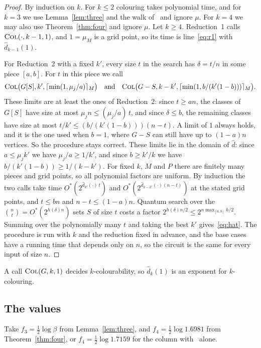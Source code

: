 \documentclass[11pt]{article}
\theoremstyle{remark}
\newcommand{\COL}{\textup{\textsc{Col}}}
\begin{document}
\begin{proof}
By induction on $k$. For $k \le 2$ colouring takes polynomial time, and for $k = 3$ we use Lemma~\ref{lem:three} and the walk of~\cite{Mon18} and ignore $\mu$. For $k = 4$ we may also use Theorem~\ref{thm:four} and ignore $\mu$. Let $k \ge 4$. Reduction~1 calls $\COL(\cdot, k-1, 1)$, and $1 = \mu_M$ is a grid point, so its time is line~\eqref{eq:r1} with $\hat d_{k-1}(1)$.

For Reduction~2 with a fixed $k'$, every size $t$ in the search has $\delta = t/n$ in some piece $[a,b]$. For $t$ in this piece we call
\[
\COL\bigl(G[S], k', \lceil \min(1, \mu_j/a) \rceil_M\bigr) \quad\text{and}\quad \COL\bigl(G - S, k - k', \lceil \min(1, b/(k'(1-b))) \rceil_M\bigr).
\]
These limits are at least the ones of Reduction~2: since $t \ge an$, the classes of $G[S]$ have size at most $\mu_j n \le (\mu_j/a)\, t$, and since $\delta \le b$, the remaining classes have size at most $t/k' \le (b/(k'(1-b)))(n-t)$. A limit of $1$ always holds, and it is the one used when $b = 1$, where $G - S$ can still have up to $(1-a)n$ vertices. So the procedure stays correct. These limits lie in the domain of $\hat d$: since $a \le \mu_j k'$ we have $\mu_j/a \ge 1/k'$, and since $b \ge k'/k$ we have $b/(k'(1-b)) \ge 1/(k-k')$. For fixed $k$, $M$ and $P$ there are finitely many pieces and grid points, so all polynomial factors are uniform. By induction the two calls take time $O^*(2^{\hat d_{k'}(\cdot)\, t})$ and $O^*(2^{\hat d_{k-k'}(\cdot)(n-t)})$ at the stated grid points, and $t \le bn$ and $n - t \le (1-a)n$. Quantum search over the $\binom{n}{t} = O^*(2^{h(\delta)n})$ sets $S$ of size $t$ costs a factor $2^{h(\delta)n/2} \le 2^{n \max_{[a,b]} h/2}$. Summing over the polynomially many $t$ and taking the best $k'$ gives~\eqref{eq:hat}. The procedure is run with $k$ and the reduction fixed in advance, and the base cases have a running time that depends only on $n$, so the circuit is the same for every input of size $n$.
\end{proof}

A call $\COL(G, k, 1)$ decides $k$-colourability, so $\hat d_k(1)$ is an exponent for $k$-colouring.

\subsection{The values}

Take $f_3 = \frac12 \log \beta$ from Lemma~\ref{lem:three}, and $f_4 = \frac12 \log 1.6981$ from Theorem~\ref{thm:four}, or $f_4 = \frac12 \log 1.7159$ for the column with~\cite{WGJ24} alone.
\end{document}
